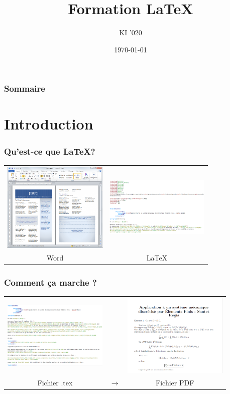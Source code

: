 \documentclass[handout]{beamer}
\title{Formation \LaTeX}
\author{KI '020}
\institute{\color{white}Ecole des Ponts Paristech}
\date{\today}
\begin{document}
	\begin{frame}
		\titlepage
	\end{frame}

	\begin{frame}
		\frametitle{Sommaire}
		\setcounter{tocdepth}{1}
		\tableofcontents
	\end{frame}

	\section{Introduction}

	\begin{frame}
		\frametitle{Qu'est-ce que \LaTeX ?}

		\begin{tabular}{cc}
			\includegraphics[width=5cm]{Images/Introduction/Word}&\includegraphics[width=5cm]{Images/Introduction/LaTeX}\\
			Word & \LaTeX
		\end{tabular}

	\end{frame}

	\begin{frame}
		\frametitle{Comment ça marche ?}

		\begin{tabular}{ccc}
			\includegraphics[width=5cm]{Images/Introduction/fichier_tex} & &
			\includegraphics[width=5cm]{Images/Introduction/fichier_PDF}\\
			Fichier .tex & $\longrightarrow$ & Fichier PDF
		\end{tabular}

	\end{frame}
\end{document}
